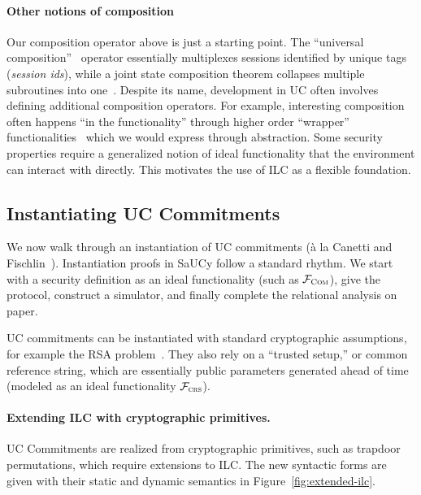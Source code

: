 \paragraph{Other notions of composition}
Our composition operator above is just a starting point.
The ``universal composition''~\cite{canetti2001universally} operator essentially multiplexes sessions identified by unique tags (\emph{session ids}), while a joint state composition theorem collapses multiple subroutines into one~\cite{canetti2003universal}.
Despite its name, development in UC often involves defining additional composition operators. 
For example, interesting composition often happens ``in the functionality'' through higher order ``wrapper'' functionalities~\cite{kosba2016hawk,katz2007universally} which we would express through abstraction. Some security properties require a generalized notion of ideal functionality that the environment can interact with directly. This motivates the use of ILC as a flexible foundation.


\subsection{Instantiating UC Commitments}
\label{subsec:example}
We now walk through an instantiation of UC commitments (\`{a} la Canetti and
Fischlin~\cite{canetti2001commitments}).  Instantiation proofs in SaUCy follow a
standard rhythm. We start with a security definition as an ideal functionality
(such as $\mathcal{{F}}_{\textsc{Com}}$), give the protocol, construct a simulator, and
finally complete the relational analysis on paper.

UC commitments can be instantiated with standard cryptographic assumptions, for
example the RSA problem~\cite{lindell2014introduction}.  They also rely on a
``trusted setup,'' or common reference string, which are essentially public
parameters generated ahead of time (modeled as an ideal functionality
$\mathcal{{F}}_{\textsc{crs}}$).

\paragraph{Extending ILC with cryptographic primitives.}
UC Commitments are realized from cryptographic primitives, such as trapdoor
permutations, which require extensions to ILC. The new syntactic forms are given
with their static and dynamic semantics in Figure~\ref{fig:extended-ilc}.

